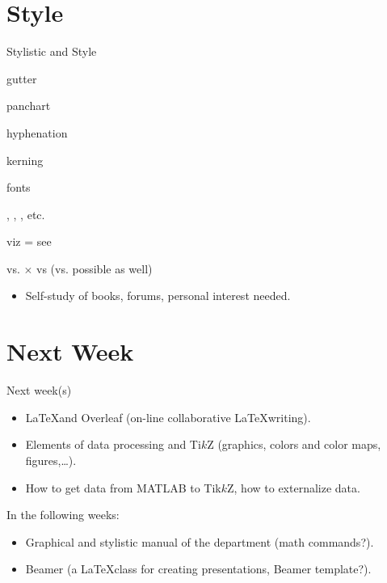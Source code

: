 \documentclass[xcolor=dvipsnames, aspectratio=169, handout, intlimits]{beamer}
\begin{document}
\section{Style}
\begin{frame}{Stylistic and Style}

gutter

panchart

hyphenation

kerning

fonts

\ie{}, \eg{}, \cf{}, etc.

viz = see

vs. $\times$ vs (vs. possible as well)

\begin{itemize}
	\item Self-study of books, forums, personal interest needed.
\end{itemize}

\end{frame}

\section{Next Week}
\begin{frame}{Next week(s)}

\begin{itemize}
	\item \LaTeX and Overleaf (on-line collaborative \LaTeX writing).
	\item Elements of data processing and Ti$k$Z (graphics, colors and color maps, figures,\dots).
	\item How to get data from MATLAB to Tik$k$Z, how to externalize data.
\end{itemize}

\vspace{0.5cm}
In the following weeks:
\begin{itemize}
	\item Graphical and stylistic manual of the department (math commands?).
	\item Beamer (a \LaTeX class for creating presentations, Beamer template?).
\end{itemize}

\end{frame}

\end{document}
